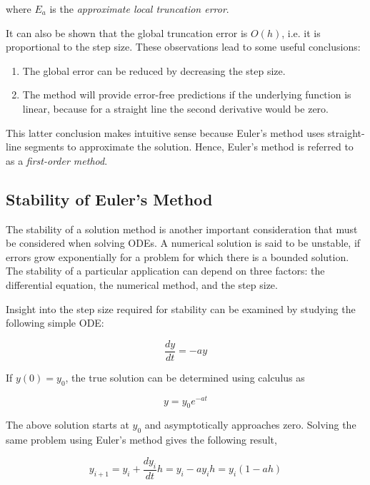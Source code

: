 \documentclass[book.tex]{subfiles}
\begin{document}
where $E_a$ is the \textit{approximate local truncation error}. 

It can also be shown that the global truncation error is $O(h)$, i.e. it is proportional to the step size. These observations lead to some useful conclusions:

\begin{enumerate}
	\item The global error can be reduced by decreasing the step size.
	\item The method will provide error-free predictions if the underlying function is linear, because for a straight line the second derivative would be zero.
\end{enumerate}

This latter conclusion makes intuitive sense because Euler’s method uses straight-line segments to approximate the solution. Hence, Euler’s method is referred to as a \textit{first-order method}.

\subsection{Stability of Euler's Method}

The stability of a solution method is another important consideration that must be considered when solving ODEs. A numerical solution is said to be unstable, if errors grow exponentially for a problem for which there is a bounded solution. The stability of a particular application can depend on three factors: the differential equation, the numerical method, and the step size.

Insight into the step size required for stability can be examined by studying the following
simple ODE:

\begin{equation*}
\frac{dy}{dt} = -ay
\end{equation*}

If $y(0)=y_0$, the true solution can be determined using calculus as

\begin{equation*}
y = y_0e^{-at}
\end{equation*}

The above solution starts at $y_0$ and asymptotically approaches zero. Solving the same problem using Euler's method gives the following result,

\begin{equation*}
y_{i+1} = y_i + \frac{dy_i}{dt}h = y_i - ay_ih = y_i(1-ah)
\end{equation*}
\end{document}
